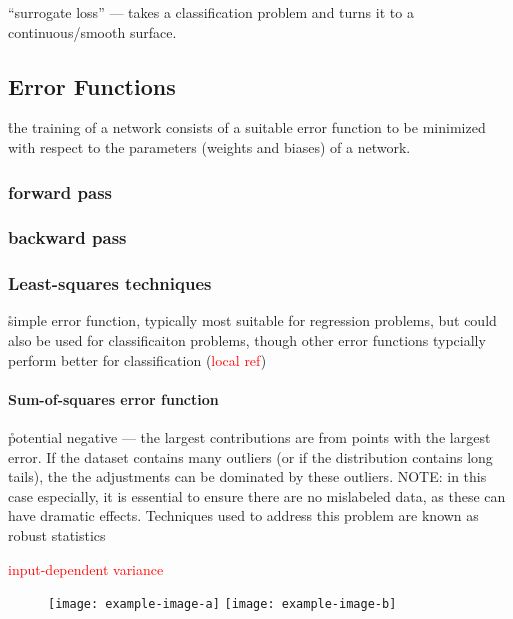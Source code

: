 \r{``surrogate loss'' --- takes a classification problem and turns it to a continuous/smooth surface.}

\subsection{Error Functions}


\r{the training of a network consists of a suitable error function to be minimized with respect to the parameters (weights and biases) of a network.}



\subsubsection{forward pass}

\subsubsection{backward pass}

\subsubsection{Least-squares techniques}

\r{simple error function, typically most suitable for regression problems, but could also be used for classificaiton problems, though other error functions typcially perform better for classification (\textcolor{red}{local ref})}

\paragraph{Sum-of-squares error function}

\r{potential negative --- the largest contributions are from points with the largest error. If the dataset contains many outliers (or if the distribution contains long tails), the the adjustments can be dominated by these outliers. NOTE: in this case especially, it is essential to ensure there are no mislabeled data, as these can have dramatic effects. Techniques used to address this problem are known as robust statistics }

\textcolor{red}{input-dependent variance}

\begin{figure}[htp]
	\centering
	\texttt{[image: example-image-a]}\hfil
	\texttt{[image: example-image-b]}\hfil
	\caption{ }
	\label{fig:basics_error_fn_sumofsquares_outlier}
\end{figure}

